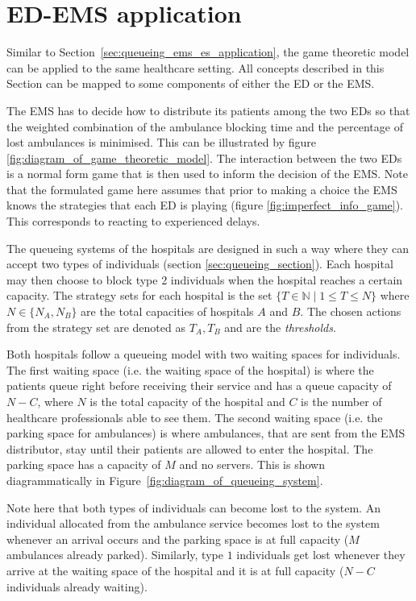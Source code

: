 \section{ED-EMS application}\label{sec:game_ems_es_application}

Similar to Section~\ref{sec:queueing_ems_es_application}, the game theoretic
model can be applied to the same healthcare setting.
All concepts described in this Section can be mapped to some components of
either the ED or the EMS.

The EMS has to decide how to distribute its patients among the two EDs so that
the weighted combination of the ambulance blocking time and the percentage of
lost ambulances is minimised.
This can be illustrated by figure \ref{fig:diagram_of_game_theoretic_model}.
The interaction between the two
EDs is a normal form game that is then used to inform the decision of the EMS.
Note that the formulated game here assumes that prior to making a choice the
EMS knows the strategies that each ED is playing (figure
\ref{fig:imperfect_info_game}).
This corresponds to reacting to experienced delays.

The queueing systems of the hospitals are designed in such a way where they can
accept two types of individuals (section \ref{sec:queueing_section}).
Each hospital may then choose to block type 2 individuals
when the hospital reaches a certain capacity.
The strategy sets for each hospital is the set
\( \{T \in \mathbb{N} \;|\; 1 \leq T \leq N\} \) where \(N \in\{N_A, N_B\}\) are
the total capacities of hospitals \(A\) and \(B\).
The chosen actions from the strategy set are denoted as \(T_A, T_B\) and are
the \textit{thresholds}.

Both hospitals follow a queueing model with two waiting spaces for
individuals.
The first waiting space (i.e. the waiting space of the hospital) is where the
patients queue right before receiving
their service and has a queue capacity of \( N - C \), where \(N\) is the total
capacity of the hospital and \(C\) is the number of healthcare
professionals able to see them.
The second waiting space (i.e. the parking space for ambulances) is where
ambulances, that are sent from the
EMS distributor, stay until their patients are allowed to enter the hospital.
The parking space has a capacity of \(M\) and no servers.
This is shown diagrammatically in Figure~\ref{fig:diagram_of_queueing_system}.

Note here that both types of individuals can become lost to the system.
An individual allocated from the ambulance service becomes lost to the system
whenever
an arrival occurs and the parking space is at full capacity (\(M\)
ambulances already parked).
Similarly, type \(1\) individuals get lost whenever they arrive at the waiting
space of the hospital and it is at full capacity (\(N - C\) individuals already
waiting).

